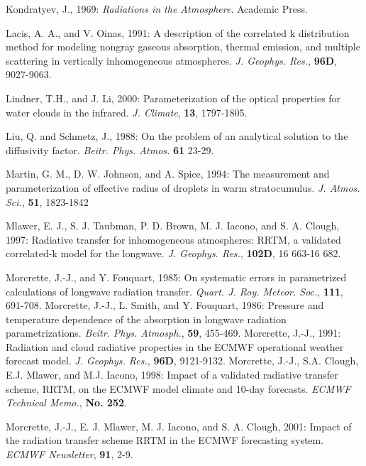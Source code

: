 \decrefname
Kondratyev, J., 1969:
      {\it Radiations in the Atmosphere}.
      Academic Press.

\decrefname
Lacis, A. A., and V. Oinas, 1991: A description of the correlated k distribution method for modeling nongray gaseous absorption, thermal emission, and multiple scattering in vertically inhomogeneous atmospheres.
 {\it J. Geophys. Res.},
 {\bf 96D},
 9027-9063.

\decrefname
Lindner, T.H., and J. Li, 2000: Parameterization of the optical properties for water clouds in the infrared.
{\it J. Climate},
{\bf 13},
1797-1805.

\decrefname
Liu, Q. and Schmetz, J., 1988: On the problem of an analytical solution to the diffusivity factor.
 {\it Beitr. Phys. Atmos. }
 {\bf 61 }
 23-29.

\decrefname
Martin, G. M., D. W. Johnson, and A. Spice, 1994: The measurement and
parameterization of effective radius of droplets in warm
stratocumulus. 
{\it J. Atmos. Sci.},
{\bf 51}, 1823-1842

\decrefname
Mlawer, E. J., S. J. Taubman, P. D. Brown, M. J. Iacono, and S. A. Clough, 1997:
Radiative transfer for inhomogeneous atmospheres: RRTM, a validated correlated-k model for the longwave. 
{\it J. Geophys. Res.},
{\bf 102D},
16 663-16 682.

\decrefname
Morcrette, J.-J., and Y. Fouquart, 1985:
      On systematic errors in parametrized calculations of longwave radiation
      transfer.
      {\it Quart. J. Roy. Meteor. Soc.},
      {\bf 111},
      691-708.
\decrefname
Morcrette, J.-J., L. Smith, and Y. Fouquart, 1986:
      Pressure and temperature dependence of the absorption in longwave
      radiation parametrizations.
      {\it Beitr. Phys. Atmosph.},
      {\bf 59},
      455-469.
\decrefname
Morcrette, J.-J., 1991: Radiation and cloud radiative properties in the ECMWF operational weather forecast model.
 {\it J. Geophys. Res.},
 {\bf 96D},
 9121-9132.
\decrefname
Morcrette, J.-J., S.A. Clough, E.J. Mlawer, and M.J. Iacono, 1998: Impact of
a validated radiative transfer scheme, RRTM, on the ECMWF model climate and
10-day forecasts.
{\it  ECMWF Technical Memo.},
{\bf  No. 252}.

\decrefname
Morcrette, J.-J., E. J. Mlawer, M. J. Iacono, and S. A. Clough, 2001: Impact
of the radiation transfer scheme RRTM in the ECMWF forecasting system.
{\it ECMWF Newsletter},
{\bf 91},
 2-9.

